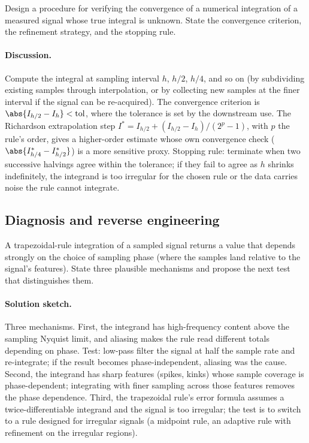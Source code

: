 \begin{exercise}
Design a procedure for verifying the convergence of a numerical
integration of a measured signal whose true integral is unknown.
State the convergence criterion, the refinement strategy, and the
stopping rule.
\end{exercise}

\paragraph{Discussion.}
Compute the integral at sampling interval $h$, $h/2$, $h/4$, and
so on (by subdividing existing samples through interpolation, or
by collecting new samples at the finer interval if the signal can
be re-acquired). The convergence criterion is $\abs{I_{h/2} -
I_{h}} < \mathrm{tol}$, where the tolerance is set by the
downstream use. The Richardson extrapolation step
$I^{*} = I_{h/2} + (I_{h/2} - I_{h})/(2^{p} - 1)$, with $p$ the
rule's order, gives a higher-order estimate whose own convergence
check ($\abs{I_{h/4}^{*} - I_{h/2}^{*}}$) is a more sensitive
proxy. Stopping rule: terminate when two successive halvings
agree within the tolerance; if they fail to agree as $h$ shrinks
indefinitely, the integrand is too irregular for the chosen rule
or the data carries noise the rule cannot integrate.

\subsection*{Diagnosis and reverse engineering}

\begin{exercise}
A trapezoidal-rule integration of a sampled signal returns a value
that depends strongly on the choice of sampling phase (where the
samples land relative to the signal's features). State three
plausible mechanisms and propose the next test that distinguishes
them.
\end{exercise}

\paragraph{Solution sketch.}
Three mechanisms. First, the integrand has high-frequency content
above the sampling Nyquist limit, and aliasing makes the rule
read different totals depending on phase. Test: low-pass filter
the signal at half the sample rate and re-integrate; if the
result becomes phase-independent, aliasing was the cause. Second,
the integrand has sharp features (spikes, kinks) whose sample
coverage is phase-dependent; integrating with finer sampling
across those features removes the phase dependence. Third, the
trapezoidal rule's error formula assumes a twice-differentiable
integrand and the signal is too irregular; the test is to switch
to a rule designed for irregular signals (a midpoint rule, an
adaptive rule with refinement on the irregular regions).

